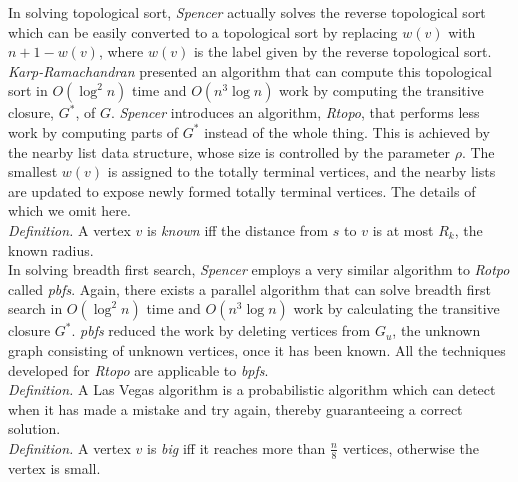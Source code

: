 \documentclass[paper=a4, fontsize=11pt]{scrartcl} %
\numberwithin{equation}{section} %
\numberwithin{figure}{section} %
\numberwithin{table}{section} %
\begin{document}
In solving topological sort, \textit{Spencer\cite{S97}} actually solves the reverse topological sort which can be easily converted to a topological sort by replacing $w(v)$ with $n + 1 - w(v)$, where $w(v)$ is the label given by the reverse topological sort. \textit{Karp-Ramachandran\cite{KR90}} presented an algorithm that can compute this topological sort in $O(\log^2{n})$ time and $O(n^3\log{n})$ work by computing the transitive closure, $G^*$, of $G$. \textit{Spencer\cite{S97}} introduces an algorithm, \textit{Rtopo}, that performs less work by computing parts of $G^*$ instead of the whole thing. This is achieved by the nearby list data structure, whose size is controlled by the parameter $\rho$. The smallest $w(v)$ is assigned to the totally terminal vertices, and the nearby lists are updated to expose newly formed totally terminal vertices. The details of which we omit here.\\   

\textit{Definition.} A vertex $v$ is \textit{known} iff the distance from $s$ to $v$ is at most $R_k$, the known radius.\\

In solving breadth first search, \textit{Spencer\cite{S97}} employs a very similar algorithm to \textit{Rotpo} called \textit{pbfs}. Again, there exists a parallel algorithm that can solve breadth first search in $O(\log^2{n})$ time and $O(n^3\log{n})$ work by calculating the transitive closure $G^*$. \textit{pbfs} reduced the work by deleting vertices from $G_u$, the unknown graph consisting of unknown vertices, once it has been known. All the techniques developed for \textit{Rtopo} are applicable to \textit{bpfs}. \\

\textit{Definition.} A Las Vegas algorithm is a probabilistic algorithm which can detect when it has made a mistake and try again, thereby guaranteeing a correct solution.\\

\textit{Definition.} A vertex $v$ is \textit{big} iff it reaches more than \textit{$\frac{n}{8}$} vertices, otherwise the vertex is small.\\
\end{document}
